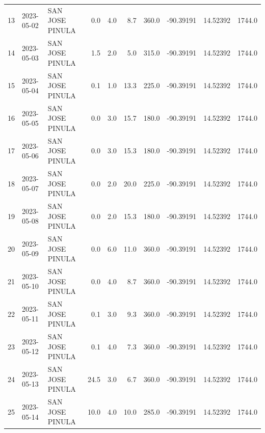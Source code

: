\documentclass[12pt]{article}
\begin{document}
\begin{center}
\begin{tabular}{lllrrrrrrr}
13  & 2023-05-02 &  SAN JOSE PINULA &     0.0 &  4.0 &         8.7 &       360.0 & -90.39191 &  14.52392 &   1744.0 \\
14  & 2023-05-03 &  SAN JOSE PINULA &     1.5 &  2.0 &         5.0 &       315.0 & -90.39191 &  14.52392 &   1744.0 \\
15  & 2023-05-04 &  SAN JOSE PINULA &     0.1 &  1.0 &        13.3 &       225.0 & -90.39191 &  14.52392 &   1744.0 \\
16  & 2023-05-05 &  SAN JOSE PINULA &     0.0 &  3.0 &        15.7 &       180.0 & -90.39191 &  14.52392 &   1744.0 \\
17  & 2023-05-06 &  SAN JOSE PINULA &     0.0 &  3.0 &        15.3 &       180.0 & -90.39191 &  14.52392 &   1744.0 \\
18  & 2023-05-07 &  SAN JOSE PINULA &     0.0 &  2.0 &        20.0 &       225.0 & -90.39191 &  14.52392 &   1744.0 \\
19  & 2023-05-08 &  SAN JOSE PINULA &     0.0 &  2.0 &        15.3 &       180.0 & -90.39191 &  14.52392 &   1744.0 \\
20  & 2023-05-09 &  SAN JOSE PINULA &     0.0 &  6.0 &        11.0 &       360.0 & -90.39191 &  14.52392 &   1744.0 \\
21  & 2023-05-10 &  SAN JOSE PINULA &     0.0 &  4.0 &         8.7 &       360.0 & -90.39191 &  14.52392 &   1744.0 \\
22  & 2023-05-11 &  SAN JOSE PINULA &     0.1 &  3.0 &         9.3 &       360.0 & -90.39191 &  14.52392 &   1744.0 \\
23  & 2023-05-12 &  SAN JOSE PINULA &     0.1 &  4.0 &         7.3 &       360.0 & -90.39191 &  14.52392 &   1744.0 \\
24  & 2023-05-13 &  SAN JOSE PINULA &    24.5 &  3.0 &         6.7 &       360.0 & -90.39191 &  14.52392 &   1744.0 \\
25  & 2023-05-14 &  SAN JOSE PINULA &    10.0 &  4.0 &        10.0 &       285.0 & -90.39191 &  14.52392 &   1744.0 \\
\bottomrule
\end{tabular}

        
        \end{center}
        
\end{document}
